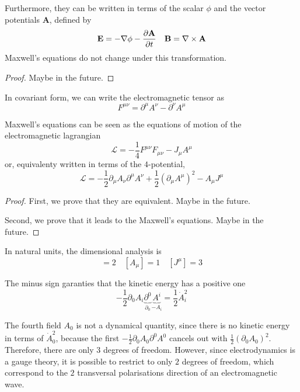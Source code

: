     Furthermore, they can be written in terms of the scalar $\phi$ and the vector potentials $\mathbf A$, defined by
    \begin{equation*}
        \mathbf E = - \nabla \phi - \frac{\partial\mathbf A}{\partial t} \quad \mathbf B = \nabla \times \mathbf A
    \end{equation*}
    Maxwell's equations do not change under this transformation. 

    \begin{proof}
        Maybe in the future.
    \end{proof}

    In covariant form, we can write the electromagnetic tensor as 
    \begin{equation*}
        F^{\mu\nu} = \partial^\mu A^\nu - \partial^\nu A^\mu
    \end{equation*}

    Maxwell's equations can be seen as the equations of motion of the electromagnetic lagrangian 
    \begin{equation*}
        \mathcal L = - \frac{1}{4} F^{\mu\nu} F_{\mu\nu} - J_\mu A^\mu
    \end{equation*}
    or, equivalenty written in terms of the $4$-potential, 
    \begin{equation*}
        \mathcal L = - \frac{1}{2} \partial_\mu A_\nu \partial^\mu A^\nu + \frac{1}{2} (\partial_\mu A^\mu) ^2 - A_\mu J^\mu
    \end{equation*}

    \begin{proof}
        First, we prove that they are equivalent.
        Maybe in the future. 

        Second, we prove that it leads to the Maxwell's equations.
        Maybe in the future.
    \end{proof}

    In natural units, the dimensional analysis is 
    \begin{equation*}
        [F^{\mu\nu}] = 2 \quad [A_\mu] = 1 \quad [J^\mu] = 3
    \end{equation*}

    The minus sign garanties that the kinetic energy has a positive one 
    \begin{equation*}
        - \frac{1}{2} \partial_0 A_i \underbrace{\partial^0}_{\partial_0} \underbrace{A^i}_{-A_i} = \frac{1}{2} \dot A_i^2
    \end{equation*}

    The fourth field $A_0$ is not a dynamical quantity, since there is no kinetic energy in terms of $\dot A_0^2$, because the first $- \frac{1}{2} \partial_0 A_0 \partial^0 A^0$ cancels out with $\frac{1}{2} (\partial_0 A_0)^2$. Therefore, there are only $3$ degrees of freedom. However, since electrodynamics is a gauge theory, it is possible to restrict to only $2$ degrees of freedom, which correspond to the $2$ transversal polarisations direction of an electromagnetic wave.

